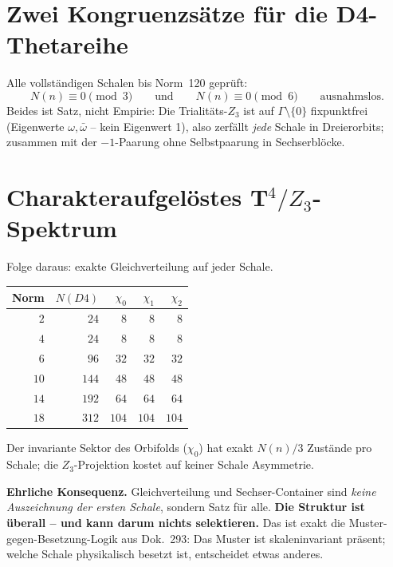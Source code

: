 \documentclass[11pt]{report}
\begin{document}
\section{Zwei Kongruenzsätze für die D4-Thetareihe}

Alle vollständigen Schalen bis Norm~120 geprüft:
\begin{equation}
  N(n) \equiv 0 \pmod 3
  \qquad\text{und}\qquad
  N(n) \equiv 0 \pmod 6
  \qquad\text{ausnahmslos.}
\end{equation}
Beides ist Satz, nicht Empirie: Die Trialitäts-$Z_3$ ist auf
$\Gamma\setminus\{0\}$ fixpunktfrei (Eigenwerte $\omega,\bar\omega$
-- kein Eigenwert 1), also zerfällt \emph{jede} Schale in
Dreierorbits; zusammen mit der $-1$-Paarung ohne Selbstpaarung in
Sechserblöcke.

\section{Charakteraufgelöstes T$^4/Z_3$-Spektrum}

Folge daraus: exakte Gleichverteilung auf jeder Schale.

\begin{center}
\begin{tabular}{rrrrr}
\toprule
Norm & $N(D4)$ & $\chi_0$ & $\chi_1$ & $\chi_2$ \\
\midrule
$2$ & $24$ & $8$ & $8$ & $8$ \\
$4$ & $24$ & $8$ & $8$ & $8$ \\
$6$ & $96$ & $32$ & $32$ & $32$ \\
$10$ & $144$ & $48$ & $48$ & $48$ \\
$14$ & $192$ & $64$ & $64$ & $64$ \\
$18$ & $312$ & $104$ & $104$ & $104$ \\
\bottomrule
\end{tabular}
\end{center}

Der invariante Sektor des Orbifolds ($\chi_0$) hat exakt $N(n)/3$
Zustände pro Schale; die $Z_3$-Projektion kostet auf keiner Schale
Asymmetrie.

\textbf{Ehrliche Konsequenz.} Gleichverteilung und Sechser-Container
sind \emph{keine Auszeichnung der ersten Schale}, sondern Satz für
alle. \textbf{Die Struktur ist überall -- und kann darum nichts
selektieren.} Das ist exakt die Muster-gegen-Besetzung-Logik aus
Dok.~293: Das Muster ist skaleninvariant präsent; welche Schale
physikalisch besetzt ist, entscheidet etwas anderes.
\end{document}
